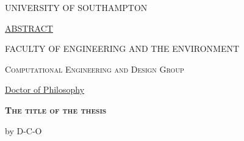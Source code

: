 \thispagestyle{empty}

 
\begin{center}
    \setlength{\parskip}{0pt}
    {\normalsize \textsc{UNIVERSITY OF SOUTHAMPTON} \par \par}
    \bigskip
    {\underline{ABSTRACT} \par \par}
    \bigskip
    {\normalsize \textsc{FACULTY OF ENGINEERING AND THE ENVIRONMENT}\par \par}
    {\normalsize \textsc{Computational Engineering and Design Group} \par \par}
    \bigskip
    {\normalsize \underline{Doctor of Philosophy}\par \par}
    \bigskip
    {\normalsize\textbf{\textsc{The title of the thesis}} \par \par}
    \medskip
    {\normalsize by D-C-O \par \par}
    \bigskip
    \bigskip
\end{center}

\singlespacing
\noindent \lipsum[1]
 
\restoregeometry
